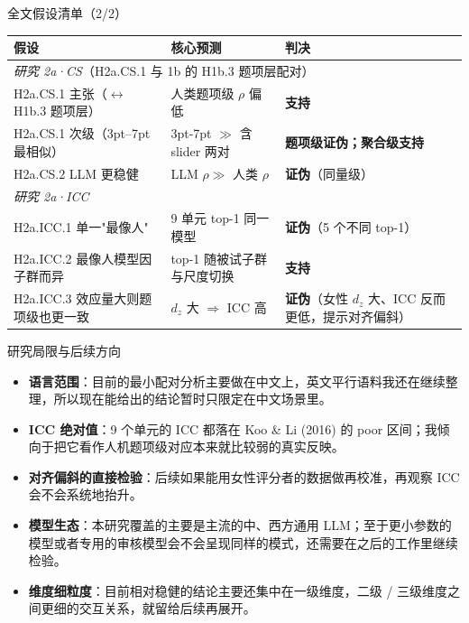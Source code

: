 \documentclass[aspectratio=169,professionalfonts]{beamer}
\begin{document}
\begin{frame}{全文假设清单（2/2）}
  \scriptsize
  \setlength{\tabcolsep}{4pt}
  \begin{table}
    \centering
    \begin{tabular}{lll}
      \toprule
      假设 & 核心预测 & 判决 \\
      \midrule
      \multicolumn{3}{l}{\textit{研究 2a·CS}（H2a.CS.1 与 1b 的 H1b.3 题项层配对）} \\
      H2a.CS.1 主张（$\leftrightarrow$ H1b.3 题项层） & 人类题项级 $\rho$ 偏低 & \textbf{支持} \\
      H2a.CS.1 次级（3pt--7pt 最相似） & 3pt-7pt $\gg$ 含 slider 两对 & \textbf{题项级证伪；聚合级支持} \\
      H2a.CS.2 LLM 更稳健 & LLM $\rho \gg$ 人类 $\rho$ & \textbf{证伪}（同量级） \\
      \midrule
      \multicolumn{3}{l}{\textit{研究 2a·ICC}} \\
      H2a.ICC.1 单一"最像人" & 9 单元 top-1 同一模型 & \textbf{证伪}（5 个不同 top-1） \\
      H2a.ICC.2 最像人模型因子群而异 & top-1 随被试子群与尺度切换 & \textbf{支持} \\
      H2a.ICC.3 效应量大则题项级也更一致 & $d_z$ 大 $\Rightarrow$ ICC 高 & \textbf{证伪}（女性 $d_z$ 大、ICC 反而更低，提示对齐偏斜） \\
      \bottomrule
    \end{tabular}
  \end{table}
\end{frame}

\begin{frame}{研究局限与后续方向}
  \begin{itemize}
    \item \textbf{语言范围}：目前的最小配对分析主要做在中文上，英文平行语料我还在继续整理，所以现在能给出的结论暂时只限定在中文场景里。
    \item \textbf{ICC 绝对值}：9 个单元的 ICC 都落在 Koo \& Li (2016) 的 poor 区间；我倾向于把它看作人机题项级对应本来就比较弱的真实反映。
    \item \textbf{对齐偏斜的直接检验}：后续如果能用女性评分者的数据做再校准，再观察 ICC 会不会系统地抬升。
    \item \textbf{模型生态}：本研究覆盖的主要是主流的中、西方通用 LLM；至于更小参数的模型或者专用的审核模型会不会呈现同样的模式，还需要在之后的工作里继续检验。
    \item \textbf{维度细粒度}：目前相对稳健的结论主要还集中在一级维度，二级 / 三级维度之间更细的交互关系，就留给后续再展开。
  \end{itemize}
\end{frame}
\end{document}
